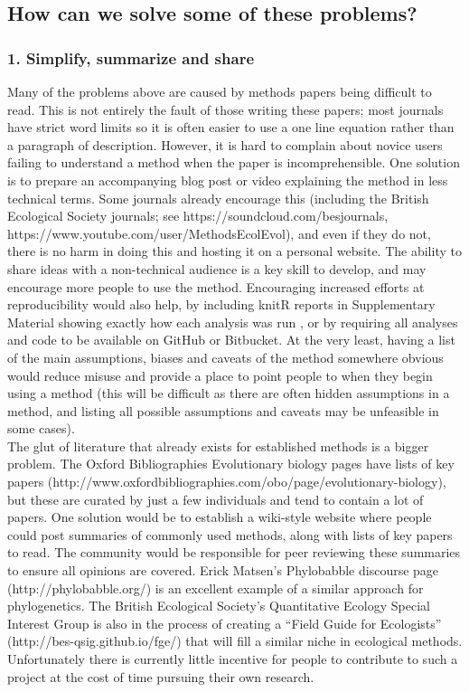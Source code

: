 \documentclass[a4paper,12pt]{article}
\begin{document}
\subsection{How can we solve some of these problems?}
  \subsubsection{1. Simplify, summarize and share}
    Many of the problems above are caused by methods papers being difficult to read. 
    This is not entirely the fault of those writing these papers; most journals have strict word limits so it is often easier to use a one line equation rather than a paragraph of description. 
    However, it is hard to complain about novice users failing to understand a method when the paper is incomprehensible.
    One solution is to prepare an accompanying blog post or video explaining the method in less technical terms. 
    Some journals already encourage this (including the British Ecological Society journals; see https://soundcloud.com/besjournals, https://www.youtube.com/user/MethodsEcolEvol), and even if they do not, there is no harm in doing this and hosting it on a personal website. 
    The ability to share ideas with a non-technical audience is a key skill to develop, and may encourage more people to use the method.
    Encouraging increased efforts at reproducibility would also help, by including knitR \citep{Xie:2015aa} reports in Supplementary Material showing exactly how each analysis was run \citep[e.g.][]{fitzjohn2014much}, or by requiring all analyses and code to be available on GitHub or Bitbucket. 
    At the very least, having a list of the main assumptions, biases and caveats of the method somewhere obvious would reduce misuse and provide a place to point people to when they begin using a method (this will be difficult as there are often hidden assumptions in a method, and listing all possible assumptions and caveats may be unfeasible in some cases).\\

    The glut of literature that already exists for established methods is a bigger problem.
    The Oxford Bibliographies Evolutionary biology pages have lists of key papers (http://www.oxfordbibliographies.com/obo/page/evolutionary-biology), but these are curated by just a few individuals and tend to contain a lot of papers. 
    One solution would be to establish a wiki-style website where people could post summaries of commonly used methods, along with lists of key papers to read. 
    The community would be responsible for peer reviewing these summaries to ensure all opinions are covered. 
    Erick Matsen's Phylobabble discourse page (http://phylobabble.org/) is an excellent example of a similar approach for phylogenetics. 
    The British Ecological Society's Quantitative Ecology Special Interest Group is also in the process of creating a ``Field Guide for Ecologists'' (http://bes-qsig.github.io/fge/) that will fill a similar niche in ecological methods.
    Unfortunately there is currently little incentive for people to contribute to such a project at the cost of time pursuing their own research.\\
\end{document}

